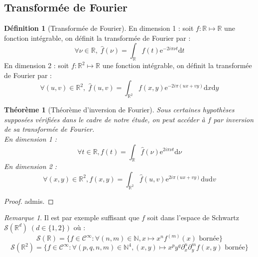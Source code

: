 \documentclass{article}
\newcommand*{\N}{\mathbb{N}}
\newcommand*{\R}{\mathbb{R}}
\newcommand*{\dd}[1]{\mathrm{d}#1}
\theoremstyle{definition}
\newtheorem{definition}{Définition}
\theoremstyle{remark}
\newtheorem{remarque}{Remarque}
\theoremstyle{plain}
\newtheorem{theorem}{Théorème}
\theoremstyle{definition}
\begin{document}
\subsection{Transformée de Fourier}
\begin{definition}[Transformée de Fourier]
        En dimension 1 : soit $f : \R \longmapsto \R$ une fonction intégrable, on définit la transformée de Fourier par : 
        $$\forall \nu \in \R, \; \widehat{f}(\nu) = \int_{\R} f(t)\mathrm{e}^{-2 i \pi \nu t } \dd t$$  
        En dimension 2 : soit $f : \R^2 \longmapsto \R$ une fonction intégrable, on définit la transformée de Fourier par : 
        $$\forall (u,v) \in \R^2, \; \widehat{f}(u,v) = \int_{\R^2} f(x,y) \mathrm{e}^{-2 i \pi (ux + vy)} \dd x \dd y $$
\end{definition}
\begin{theorem}[Théorème d'inversion de Fourier]
        Sous certaines hypothèses supposées vérifiées dans le cadre de notre étude, on peut accéder à $f$ par inversion de sa transformée de Fourier.  \\
        En dimension 1 : $$\forall t \in \R, f(t) = \int_{\R} \widehat{f}(\nu)\mathrm{e}^{2i\pi \nu t} \dd \nu$$
        En dimension 2 : $$\forall (x,y) \in \R^2, f(x,y) = \int_{\R^2} \widehat{f}(u,v)\mathrm{e}^{2i\pi (ux + vy)} \dd u \dd v$$
\end{theorem}
\begin{proof}
    admis. 
\end{proof}
\begin{remarque}
Il est par exemple suffisant que $f$ soit dans l'espace de Schwartz $\mathcal{S}(\R^d) \; (d \in \{1,2\})$ où : 
$$\mathcal{S}(\R) = \{f \in \mathcal{C}^{\infty} : \forall (n,m) \in \N, x \mapsto x^{n} f^{(m)}(x) \text{ bornée} \}$$
$$\mathcal{S}(\R^2) = \{f \in \mathcal{C}^{\infty} : \forall (p,q,n,m) \in \N^4, (x,y) \mapsto x^{p}y^q \partial_x^n \partial_y^m f(x,y) \text{ bornée}\}$$
\end{remarque}
\end{document}
